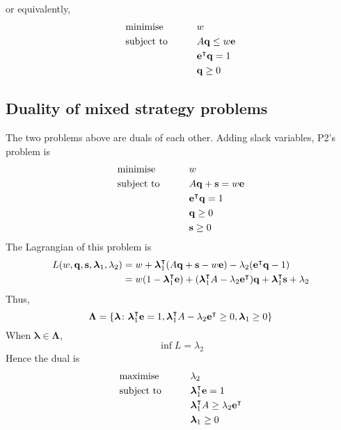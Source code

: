 or equivalently,
\begin{alignat*}{2}
	 & \text{minimise}   & \qquad & w                          \\
	 & \text{subject to} &        & A \vb q \leq w \vb e       \\
	 &                   &        & \vb e^\intercal \vb q = 1 \\
	 &                   &        & \vb q \geq 0
\end{alignat*}

\subsection{Duality of mixed strategy problems}
The two problems above are duals of each other.
Adding slack variables, P2's problem is
\begin{alignat*}{2}
	 & \text{minimise}   & \qquad & w                          \\
	 & \text{subject to} &        & A \vb q + \vb s = w \vb e  \\
	 &                   &        & \vb e^\intercal \vb q = 1 \\
	 &                   &        & \vb q \geq 0               \\
	 &                   &        & \vb s \geq 0
\end{alignat*}
The Lagrangian of this problem is
\begin{align*}
	L(w, \vb q, \vb s, \bm\lambda_1, \lambda_2) & = w + \bm\lambda_1^\intercal (A\vb q + \vb s - w\vb e) - \lambda_2 (\vb e^\intercal \vb q - 1)                                                    \\
	                                            & = w(1 - \bm\lambda_1^\intercal \vb e) + (\bm\lambda_1^\intercal A - \lambda_2 \vb e^\intercal) \vb q + \bm \lambda_1^\intercal\vb s + \lambda_2
\end{align*}
Thus,
\[
	\bm\Lambda = \qty{\bm\lambda \colon \bm\lambda_1^\intercal\vb e = 1, \bm\lambda_1^\intercal A - \lambda_2\vb e^\intercal\geq 0, \bm \lambda_1 \geq 0}
\]
When \( \bm\lambda \in \bm\Lambda \),
\[
	\inf L = \lambda_2
\]
Hence the dual is
\begin{alignat*}{2}
	 & \text{maximise}   & \qquad & \lambda_2                                                 \\
	 & \text{subject to} &        & \bm\lambda_1^\intercal \vb e = 1                         \\
	 &                   &        & \bm\lambda_1^\intercal A \geq \lambda_2 \vb e^\intercal \\
	 &                   &        & \bm \lambda_1 \geq 0
\end{alignat*}
